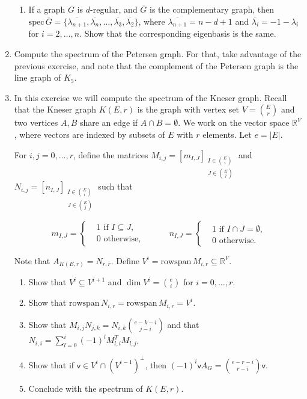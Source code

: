 \documentclass[kulak]{tplt}
\theoremstyle{definition}
\newcommand{\R}{\mathbb{R}}
\newcommand{\vv}{\mathsf{v}}
\newcommand{\rowspn}{\mathrm{rowspan}}
\newcommand{\spec}{\mathrm{spec}}
\begin{document}
\begin{enumerate}
\begin{enumerate}
\item If a graph $G$ is $d$-regular, and $\overline{G}$ is the complementary graph, then $\spec \, \overline{G} = \{ \overline{\lambda_{n+1}}, \overline{\lambda_{n}}, \ldots, \overline{\lambda_{3}}, \overline{\lambda_{2}} \}$, where $\overline{\lambda_{n+1}} = n - d + 1$ and $\overline{\lambda_i} = - 1 - \lambda _ i$ for $i = 2, \ldots, n$.
Show that the corresponding eigenbasis is the same.
\end{enumerate}


\item Compute the spectrum of the Petersen graph.
For that, take advantage of the previous exercise, and note that the complement of the Petersen graph is the line graph of $K_5$.

\item In this exercise we will compute the spectrum of the Kneser graph.
Recall that the Kneser graph $K(E, r)$ is the graph with vertex set $V = \binom{E}{r}$ and two vertices $A, B$ share an edge if $A \cap B = \emptyset$.
We work on the vector space $\R^V$, where vectors are indexed by subsets of $E$ with $r$ elements.
Let $e = |E|$.

For $i, j = 0, \ldots, r$, define the matrices $M_{i, j} = [m_{I, J}]_{\substack{I\in \binom{E}{i} \\ J \in \binom{E}{j}}}$ and $N_{i, j} = [n_{I, J}]_{\substack{I\in \binom{E}{i} \\ J \in \binom{E}{j}}}$ such that 

$$ m_{I, J} =\begin{cases*}
      & 1 \text{ if $I \subseteq J$,}\\
      & 0 \text{ otherwise,}
    \end{cases*}  \quad \quad \quad 
     n_{I, J} =\begin{cases*}
      & 1 \text{ if $I \cap J = \emptyset $,}\\
      & 0 \text{ otherwise.}
    \end{cases*}  $$

Note that $A_{K(E, r)} = N_{r, r}$.
Define $V^i = \rowspn \, M_{i, r} \subseteq \R^V$.

\begin{enumerate}
\item Show that $V^i \subseteq V^{i+1}$ and $\dim V^i = \binom{e}{i}$ for $i=0, \ldots, r$.

\item Show that $\rowspn \, N_{i, r} = \rowspn \, M_{i, r} = V^i$.

\item Show that $M_{i, j} N_{j, k} = N_{i, k} \binom{e - k - i}{j-i}$ and that $N_{i, i} = \sum_{l=0}^i (-1)^l M_{l, i}^TM_{l, j}$.

\item Show that if $\vv \in V^i \cap (V^{i-1})^{\perp}$, then $(-1)^i \vv A_G = \binom{e-r-i}{r-i} \vv $.

\item Conclude with the spectrum of $K(E, r)$.
\end{enumerate}
\end{enumerate}
\end{document}
